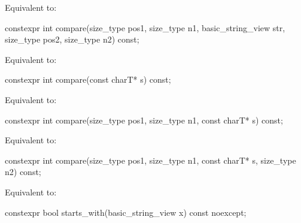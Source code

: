 \begin{itemdescr}
\pnum
\effects
Equivalent to: 
\end{itemdescr}

%
\begin{itemdecl}
constexpr int compare(size_type pos1, size_type n1, basic_string_view str,
                      size_type pos2, size_type n2) const;
\end{itemdecl}

\begin{itemdescr}
\pnum
\effects
Equivalent to: 
\end{itemdescr}

%
\begin{itemdecl}
constexpr int compare(const charT* s) const;
\end{itemdecl}

\begin{itemdescr}
\pnum
\effects
Equivalent to: 
\end{itemdescr}

%
\begin{itemdecl}
constexpr int compare(size_type pos1, size_type n1, const charT* s) const;
\end{itemdecl}

\begin{itemdescr}
\pnum
\effects
Equivalent to: 
\end{itemdescr}

%
\begin{itemdecl}
constexpr int compare(size_type pos1, size_type n1, const charT* s, size_type n2) const;
\end{itemdecl}

\begin{itemdescr}
\pnum
\effects
Equivalent to: 
\end{itemdescr}

%
\begin{itemdecl}
constexpr bool starts_with(basic_string_view x) const noexcept;
\end{itemdecl}


